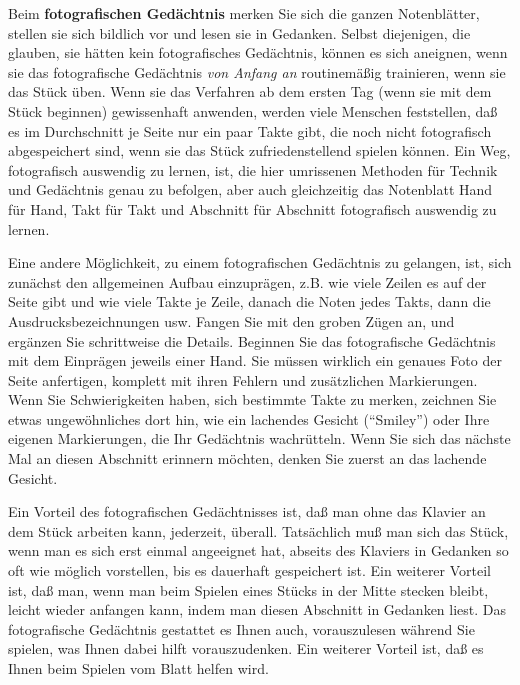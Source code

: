 \label{c1iii6foto}

Beim \textbf{fotografischen Gedächtnis} merken Sie sich die ganzen Notenblätter, stellen sie sich bildlich vor und lesen sie in Gedanken.
Selbst diejenigen, die glauben, sie hätten kein fotografisches Gedächtnis, können es sich aneignen, wenn sie das fotografische Gedächtnis \textit{von Anfang an} routinemäßig trainieren, wenn sie das Stück üben.
Wenn sie das Verfahren ab dem ersten Tag (wenn sie mit dem Stück beginnen) gewissenhaft anwenden, werden viele Menschen feststellen, daß es im Durchschnitt je Seite nur ein paar Takte gibt, die noch nicht fotografisch abgespeichert sind, wenn sie das Stück zufriedenstellend spielen können.
Ein Weg, fotografisch auswendig zu lernen, ist, die hier umrissenen Methoden für Technik und Gedächtnis genau zu befolgen, aber auch gleichzeitig das Notenblatt Hand für Hand, Takt für Takt und Abschnitt für Abschnitt fotografisch auswendig zu lernen.

Eine andere Möglichkeit, zu einem fotografischen Gedächtnis zu gelangen, ist, sich zunächst den allgemeinen Aufbau einzuprägen, z.B. wie viele Zeilen es auf der Seite gibt und wie viele Takte je Zeile, danach die Noten jedes Takts, dann die Ausdrucksbezeichnungen usw.
Fangen Sie mit den groben Zügen an, und ergänzen Sie schrittweise die Details.
Beginnen Sie das fotografische Gedächtnis mit dem Einprägen jeweils einer Hand.
Sie müssen wirklich ein genaues Foto der Seite anfertigen, komplett mit ihren Fehlern und zusätzlichen Markierungen.
Wenn Sie Schwierigkeiten haben, sich bestimmte Takte zu merken, zeichnen Sie etwas ungewöhnliches dort hin, wie ein lachendes Gesicht (\enquote{Smiley}) oder Ihre eigenen Markierungen, die Ihr Gedächtnis wachrütteln.
Wenn Sie sich das nächste Mal an diesen Abschnitt erinnern möchten, denken Sie zuerst an das lachende Gesicht.

Ein Vorteil des fotografischen Gedächtnisses ist, daß man ohne das Klavier an dem Stück arbeiten kann, jederzeit, überall.
Tatsächlich muß man sich das Stück, wenn man es sich erst einmal angeeignet hat, abseits des Klaviers in Gedanken so oft wie möglich vorstellen, bis es dauerhaft gespeichert ist.
Ein weiterer Vorteil ist, daß man, wenn man beim Spielen eines Stücks in der Mitte stecken bleibt, leicht wieder anfangen kann, indem man diesen Abschnitt in Gedanken liest.
Das fotografische Gedächtnis gestattet es Ihnen auch, vorauszulesen während Sie spielen, was Ihnen dabei hilft vorauszudenken.
Ein weiterer Vorteil ist, daß es Ihnen beim Spielen vom Blatt helfen wird.


